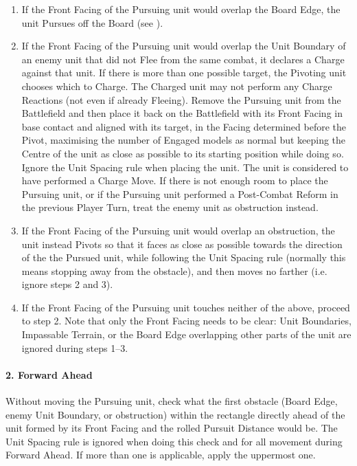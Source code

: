 \begin{enumerate}
	\item If the Front Facing of the Pursuing unit would overlap the Board Edge, the unit Pursues off the Board (see ).
	\item If the Front Facing of the Pursuing unit would overlap the Unit Boundary of an enemy unit that did not Flee from the same combat, it declares a Charge against that unit. If there is more than one possible target, the Pivoting unit chooses which to Charge. The Charged unit may not perform any Charge Reactions (not even if already Fleeing). Remove the Pursuing unit from the Battlefield and then place it back on the Battlefield with its Front Facing in base contact and aligned with its target, in the Facing determined before the Pivot, maximising the number of Engaged models as normal but keeping the Centre of the unit as close as possible to its starting position while doing so. Ignore the Unit Spacing rule when placing the unit. The unit is considered to have performed a Charge Move. If there is not enough room to place the Pursuing unit, or if the Pursuing unit performed a Post-Combat Reform in the previous Player Turn, treat the enemy unit as obstruction instead.
	\item If the Front Facing of the Pursuing unit would overlap an obstruction, the unit instead Pivots so that it faces as close as possible towards the direction of the the Pursued unit, while following the Unit Spacing rule (normally this means stopping  away from the obstacle), and then moves no farther (i.e. ignore steps 2 and 3).
	\item If the Front Facing of the Pursuing unit touches neither of the above, proceed to step 2. Note that only the Front Facing needs to be clear: Unit Boundaries, Impassable Terrain, or the Board Edge overlapping other parts of the unit are ignored during steps 1--3.
\end{enumerate}

\paragraph{2. Forward Ahead}

Without moving the Pursuing unit, check what the first obstacle (Board Edge, enemy Unit Boundary, or obstruction) within the rectangle directly ahead of the unit formed by its Front Facing and the rolled Pursuit Distance would be. The Unit Spacing rule is ignored when doing this check and for all movement during Forward Ahead. If more than one is applicable, apply the uppermost one.

